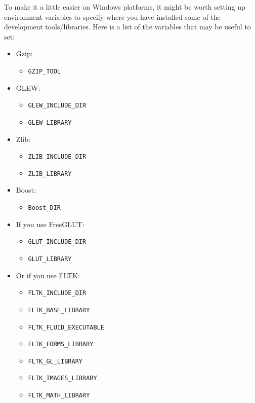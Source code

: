 \documentclass[11pt,oneside,a4paper,final]{article}
\begin{document}
To make it a little easier on Windows platforms, it might be worth setting up environment variables to specify where you have installed some of the development tools/libraries. 
Here is a list of the variables that may be useful to set:

\begin{itemize}
	\item \Gls{Gzip}:
	\begin{itemize}
		\item \verb|GZIP_TOOL|
	\end{itemize}

	\item \Gls{GLEW}:
	\begin{itemize}
		\item \verb|GLEW_INCLUDE_DIR|
		\item \verb|GLEW_LIBRARY|
	\end{itemize}
	
	\item Zlib:
	\begin{itemize}
		\item \verb|ZLIB_INCLUDE_DIR|
		\item \verb|ZLIB_LIBRARY|
	\end{itemize}
	
	\item Boost:
	\begin{itemize}
		\item \verb|Boost_DIR|
	\end{itemize}

	\item If you use FreeGLUT:
	\begin{itemize}
		\item \verb|GLUT_INCLUDE_DIR|
		\item \verb|GLUT_LIBRARY|
	\end{itemize}

	\item Or if you use \Gls{FLTK}:
	\begin{itemize}
		\item \verb|FLTK_INCLUDE_DIR|
		\item \verb|FLTK_BASE_LIBRARY|
		\item \verb|FLTK_FLUID_EXECUTABLE|
		\item \verb|FLTK_FORMS_LIBRARY|
		\item \verb|FLTK_GL_LIBRARY|
		\item \verb|FLTK_IMAGES_LIBRARY|
		\item \verb|FLTK_MATH_LIBRARY|
	\end{itemize}


\end{itemize}
\end{document}
